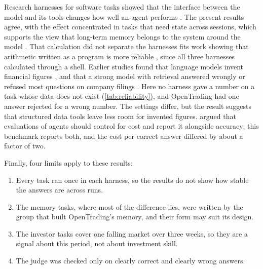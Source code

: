 \label{sec:related-results}
Research harnesses for software tasks showed that the interface between the model and its tools changes how well an agent performs \parencite{yang2024sweagent}.
The present results agree, with the effect concentrated in tasks that need state across sessions, which supports the view that long-term memory belongs to the system around the model \parencite{packer2023memgpt}.
That calculation did not separate the harnesses fits work showing that arithmetic written as a program is more reliable \parencite{gao2023pal,chen2023program}, since all three harnesses calculated through a shell.
Earlier studies found that language models invent financial figures \parencite{kang2023deficiency}, and that a strong model with retrieval answered wrongly or refused most questions on company filings \parencite{islam2023financebench}.
Here no harness gave a number on a task whose data does not exist (\cref{tab:reliability}), and OpenTrading had one answer rejected for a wrong number.
The settings differ, but the result suggests that structured data tools leave less room for invented figures.
\textcite{kapoor2024agents} argued that evaluations of agents should control for cost and report it alongside accuracy; this benchmark reports both, and the cost per correct answer differed by about a factor of two.

\label{sec:threats}
Finally, four limits apply to these results:
\begin{enumerate}
  \item Every task ran once in each harness, so the results do not show how stable the answers are across runs.
  \item The memory tasks, where most of the difference lies, were written by the group that built OpenTrading's memory, and their form may suit its design.
  \item The investor tasks cover one falling market over three weeks, so they are a signal about this period, not about investment skill.
  \item The judge was checked only on clearly correct and clearly wrong answers.
\end{enumerate}

